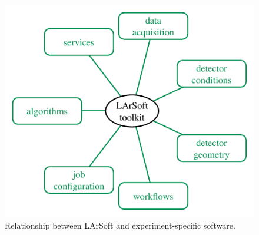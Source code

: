 \begin{figure}
   \centering
   \includegraphics{figures/LArSoftExperimentSoftware}
   \caption[Relationship between LArSoft and experiment-specific software]{
      \label{fig:LArSoftRelations:Experiments}
      Relationship between LArSoft and experiment-specific software.
   }
\end{figure}

